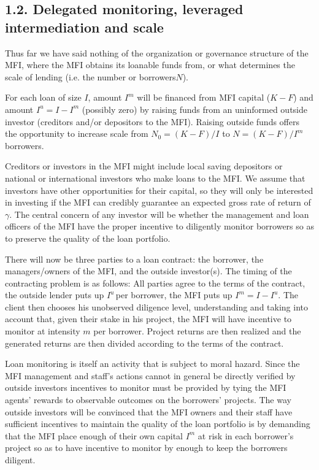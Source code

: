 \documentclass{article} %
\begin{document}
\noindent 
\subsection{1.2. Delegated monitoring, leveraged intermediation and scale}

Thus far we have said nothing of the organization or governance structure of the MFI, where the MFI obtains its loanable funds from, or what determines the scale of lending (i.e. the number or borrowers$N$).  

For each loan of size $I$, amount $I^{m} $ will be financed from MFI capital ($K-F$) and amount $I^{u} =I-I^{m} $ (possibly zero) by raising funds from an uninformed outside investor (creditors and/or depositors to the MFI).  Raising outside funds offers the opportunity to increase scale from $N_{0} =(K-F)/I$ to $N=(K-F)/I^{m} $ borrowers.   

Creditors or investors in the MFI might include local saving depositors or national or international investors who make loans to the MFI.   We assume that investors have other opportunities for their capital, so they will only be interested in investing if the MFI can credibly guarantee an expected gross rate of return of $\gamma $.  The central concern of any investor will be whether the management and loan officers of the MFI have the proper incentive to diligently monitor borrowers so as to preserve the quality of the loan portfolio. 

There will now be three parties to a loan contract: the borrower, the managers/owners of the MFI, and the outside investor(s).  The timing of the contracting problem is as follows: All parties agree to the terms of the contract, the outside lender puts up $I^{u} \, $per borrower, the MFI puts up $I^{m} =I-I^{u} .$ The client then chooses his unobserved diligence level, understanding and taking into account that, given their stake in his project, the MFI will have incentive to monitor at intensity $m$ per borrower. Project returns are then realized and the generated returns are then divided according to the terms of the contract. 

Loan monitoring is itself an activity that is subject to moral hazard.  Since the MFI management and staff's actions cannot in general be directly verified by outside investors incentives to monitor must be provided by tying the MFI agents' rewards to observable outcomes on the borrowers' projects.  The way outside investors will be convinced that the MFI owners and their staff have sufficient incentives to maintain the quality of the loan portfolio is by demanding that the MFI place enough of their own capital $I^{m} $ at risk in each borrower's project so as to have incentive to monitor by enough to keep the borrowers diligent. 
\end{document}
